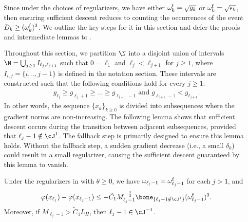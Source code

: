 Since under the choices of regularizers, we have either $\omega_k^{\mathrm{f}} = \sqrt{g_k}$ or $\omega_k^{\mathrm{f}} = \sqrt{\epsilon_k}$, then ensuring sufficient descent reduces to counting the occurrences of the event $D_k \geq (\omega_k^{\mathrm{f}})^3$. 
We outline the key steps for it in this section and defer the proofs and intermediate lemmas to .

Throughout this section, we partition %
$\N$ 
into a disjoint union of intervals $\N = \bigcup_{j\geq 1} I_{\ell_j, \ell_{j+1}}$ such that 
 $0 = \ell_1$ and $\ell_j < \ell_{j+1}$ for $j \geq 1$, where $I_{i,j}=\{i, .., j-1\}$ is defined in the notation section. %
These intervals are constructed such that the following conditions hold for every $j \geq 1$:
\begin{align}
    g_{\ell_j} \geq g_{\ell_j + 1} \geq \dots \geq g_{\ell_{j+1} - 1}
    \text{ and }
    g_{\ell_{j+1} - 1} < g_{\ell_{j+1}}.
    \label{eqn:proof/newton-partition}
\end{align}
In other words, the sequence $\{x_k\}_{k \ge0}$ is divided into subsequences where the gradient norms are non-increasing.
The following lemma shows that sufficient descent occurs during the transition between adjacent subsequences, 
provided that $\ell_j - 1\notin \cJ^1$.
The fallback step is primarily designed to ensure this lemma holds. 
Without the fallback step, a sudden gradient decrease (i.e., a small $\delta_k$) could result in a small regularizer, causing the sufficient descent guaranteed by this lemma to vanish.

\begin{lemma}
    \label{lem:main/transition-between-subsequences-give-valid-regularizer}
    Under the regularizers in  with $\theta \geq 0$, 
    we have $\omega_{\ell_{j}-1} = \omega_{\ell_{j}-1}^{\mathrm{f}}$ for each $j > 1$, and 
    \begin{equation}
        \label{eqn:main/inexact-mixed-newton-boundary-bound}
        \varphi(x_{\ell_{j}})
        - \varphi(x_{\ell_{j}-1}) 
        \leq 
        -\tilde C_1 M_{\ell_j-1}^{-\frac{1}{2}} \bone_{\{\ell_{j}-1 \notin \cJ^{1}\}} (\omega_{\ell_{j}-1}^{\supfallback})^3.
    \end{equation}
    Moreover, if $M_{\ell_j-1} > \tilde C_4 L_H$, then $\ell_j -1 \in\cJ^{-1}$.
\end{lemma}

